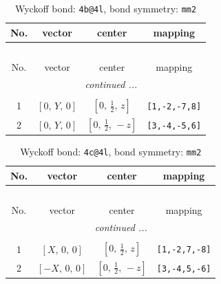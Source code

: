 \documentclass[fleqn,8pt]{jsarticle}
\begin{document}
\renewcommand{\arraystretch}{1.2}
\begin{longtable}{cccc}
\caption{Wyckoff bond: {\tt 4b@4l}, bond symmetry: {\tt mm2}}
 \\
 \hline \hline
No. & vector & center & mapping \\ \hline \endfirsthead

\multicolumn{3}{l}{\tablename\ \thetable{}} \\
 \hline \hline
No. & vector & center & mapping \\ \hline \endhead

 \hline \hline
\multicolumn{3}{r}{\footnotesize\it continued ...} \\ \endfoot

 \hline \hline
\multicolumn{3}{r}{} \\ \endlastfoot

1 & $\left[ 0,\, Y,\, 0 \right]$ & $\left[ 0,\, \frac{1}{2},\, z \right]$ & {\tt [1,-2,-7,8]} \\ \hline
2 & $\left[ 0,\, Y,\, 0 \right]$ & $\left[ 0,\, \frac{1}{2},\, - z \right]$ & {\tt [3,-4,-5,6]} \\
\end{longtable}
\renewcommand{\arraystretch}{1.2}
\begin{longtable}{cccc}
\caption{Wyckoff bond: {\tt 4c@4l}, bond symmetry: {\tt mm2}}
 \\
 \hline \hline
No. & vector & center & mapping \\ \hline \endfirsthead

\multicolumn{3}{l}{\tablename\ \thetable{}} \\
 \hline \hline
No. & vector & center & mapping \\ \hline \endhead

 \hline \hline
\multicolumn{3}{r}{\footnotesize\it continued ...} \\ \endfoot

 \hline \hline
\multicolumn{3}{r}{} \\ \endlastfoot

1 & $\left[ X,\, 0,\, 0 \right]$ & $\left[ 0,\, \frac{1}{2},\, z \right]$ & {\tt [1,-2,7,-8]} \\ \hline
2 & $\left[ - X,\, 0,\, 0 \right]$ & $\left[ 0,\, \frac{1}{2},\, - z \right]$ & {\tt [3,-4,5,-6]} \\
\end{longtable}
\renewcommand{\arraystretch}{1.2}
\end{document}
